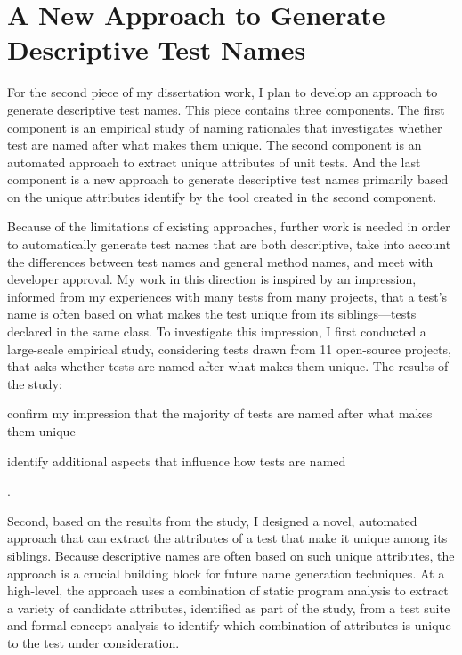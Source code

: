 \section{A New Approach to Generate Descriptive Test Names}
\label{sec:generate-names}

For the second piece of my dissertation work, I plan to develop an approach to generate descriptive test names.
%
This piece contains three components.
%
The first component is an empirical study of naming rationales that investigates whether test are named after what makes them unique.
%
The second component is an automated approach to extract unique attributes of unit tests.
%
And the last component is a new approach to generate descriptive test names primarily based on the unique attributes identify by the tool created in the second component.


Because of the limitations of existing approaches, further work is needed in order to automatically generate test names that are both descriptive, take into account the differences between test names and general method names, and meet with developer approval.
%
My work in this direction is inspired by an impression, informed from my experiences with many tests from many projects, that a test's name is often based on what makes the test unique from its siblings---tests declared in the same class.
%
To investigate this impression, I first conducted a large-scale empirical study, considering tests drawn from \num{11} open-source projects, that asks whether tests are named after what makes them unique.
%
The results of the study:
\begin{enumerate*}
\item confirm my impression that the majority of tests are named after what makes them unique
\item identify additional aspects that influence how tests are named
\end{enumerate*}.


Second, based on the results from the study, I designed a novel, automated approach that can extract the attributes of a test that make it unique among its siblings.
%
Because descriptive names are often based on such unique attributes, the approach is a crucial building block for future name generation techniques.  
%
At a high-level, the approach uses a combination of static program analysis to extract a variety of candidate attributes, identified as part of the study, from a test suite and formal concept analysis to identify which combination of attributes is unique to the test under consideration.


